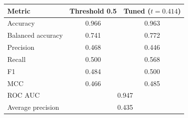 \begin{tabular}{lcc}
\toprule
Metric & Threshold 0.5 & Tuned ($t = 0.414$) \\
\midrule
Accuracy & 0.966 & 0.963 \\
Balanced accuracy & 0.741 & 0.772 \\
Precision & 0.468 & 0.446 \\
Recall & 0.500 & 0.568 \\
F1 & 0.484 & 0.500 \\
MCC & 0.466 & 0.485 \\
\midrule
ROC AUC & \multicolumn{2}{c}{0.947} \\
Average precision & \multicolumn{2}{c}{0.435} \\
\bottomrule
\end{tabular}
